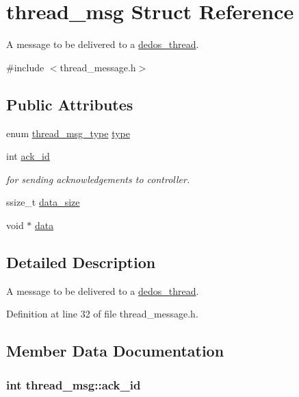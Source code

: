 \hypertarget{structthread__msg}{\section{thread\-\_\-msg Struct Reference}
\label{structthread__msg}
}


A message to be delivered to a \hyperlink{structdedos__thread}{dedos\-\_\-thread}.  




{\ttfamily \#include $<$thread\-\_\-message.\-h$>$}

\subsection*{Public Attributes}
\begin{DoxyCompactItemize}
\item 
enum \hyperlink{thread__message_8h_ae1d212e0fe0ba69bb058e9d25e286380}{thread\-\_\-msg\-\_\-type} \hyperlink{structthread__msg_a21b68a06c996049760fba8a1b148d215}{type}
\item 
int \hyperlink{structthread__msg_ad59749a939b0157e7e81445909ea8f3a}{ack\-\_\-id}
\begin{DoxyCompactList}\small\item\em for sending acknowledgements to controller. \end{DoxyCompactList}\item 
ssize\-\_\-t \hyperlink{structthread__msg_a7f32cae0c8abf93abf07be5fb141530f}{data\-\_\-size}
\item 
void $\ast$ \hyperlink{structthread__msg_adbe60c1c6c0aca2e83f5e3e5bedb1b18}{data}
\end{DoxyCompactItemize}


\subsection{Detailed Description}
A message to be delivered to a \hyperlink{structdedos__thread}{dedos\-\_\-thread}. 

Definition at line 32 of file thread\-\_\-message.\-h.



\subsection{Member Data Documentation}
\hypertarget{structthread__msg_ad59749a939b0157e7e81445909ea8f3a}{
\subsubsection[{ack\-\_\-id}]{\setlength{\rightskip}{0pt plus 5cm}int thread\-\_\-msg\-::ack\-\_\-id}}\label{structthread__msg_ad59749a939b0157e7e81445909ea8f3a}


